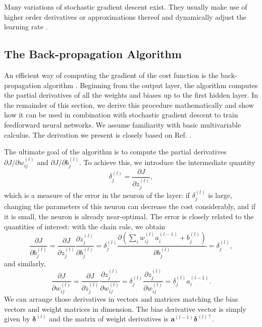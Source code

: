 Many variations of stochastic gradient descent exist. They usually make use of higher order derivatives or approximations thereof and dynamically adjust the learning rate \cite{DBLP:journals/corr/Ruder16}.

\subsection{The Back-propagation Algorithm}
An efficient way of computing the gradient of the cost function is the back-propagation algorithm \cite{Rumelhart1986533}. Beginning from the output layer, the algorithm computes the partial derivatives of all the weights and biases up to the first hidden layer. In the remainder of this section, we derive this procedure mathematically and show how it can be used in combination with stochastic gradient descent to train feedforward neural networks. We assume familiarity with basic multivariable calculus. The derivation we present is closely based on Ref. \cite[Ch.\,2]{Nielsen2015}.

The ultimate goal of the algorithm is to compute the partial derivatives $\partial J/\partial w_{ij}^{(l)}$ and $\partial J/\partial b_j^{(l)}$. To achieve this, we introduce the intermediate quantity
\begin{equation}
\delta_j^{(l)} = \frac{\partial J}{\partial z_j^{(l)}},
\end{equation}
which is a measure of the error in the  neuron of the  layer: if $\delta_j^{(l)}$ is large, changing the parameters of this neuron can decrease the cost considerably, and if it is small, the neuron is already near-optimal. The error is closely related to the quantities of interest: with the chain rule, we obtain
\begin{equation}\label{eq:bp1}
\frac{\partial J}{\partial b_j^{(l)}}
= \frac{\partial J}{\partial z_j^{(l)}}\frac{\partial z_j^{(l)}}{\partial b_j^{(l)}}
= \delta_j^{(l)} \frac{\partial\left (\sum_{i}w_{ij}^{(l)}a_i^{(l-1)} + b_j^{(l)}\right)}{\partial b_j^{(l)}}
= \delta_j^{(l)},
\end{equation}
and similarly,
\begin{equation}\label{eq:bp2}
\frac{\partial J}{\partial w_{ij}^{(l)}}
= \frac{\partial J}{\partial z_j^{(l)}}\frac{\partial z_j^{(l)}}{\partial w_{ij}^{(l)}}
= \delta_j^{(l)} \frac{\partial z_j^{(l)}}{\partial w_{ij}^{(l)}}
= \delta_j^{(l)}a_i^{(l-1)}.
\end{equation}
We can arrange those derivatives in vectors and matrices matching the bias vectors and weight matrices in dimension. The bias derivative vector is simply given by $\bm{\delta}^{(l)}$ and the matrix of weight derivatives is $\bm{a}^{(l-1)}\bm{\delta}^{(l)\top}$.

